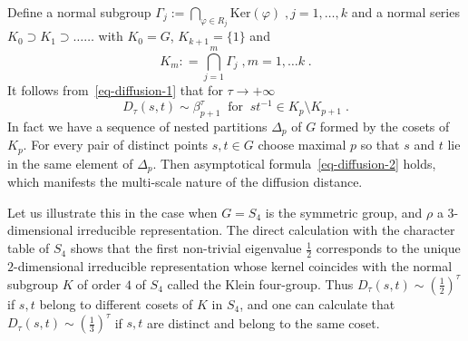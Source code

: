 \documentclass[11pt]{article}
\theoremstyle{definition}
\numberwithin{equation}{section}
\numberwithin{figure}{section}
\numberwithin{table}{section}
\newcommand\< {\mathcal{h}}
\renewcommand\> {\mathcal{i}}
\begin{document}
Define a normal subgroup $\Gamma_j := \bigcap_{\varphi \in R_j} \text{Ker} (\varphi)\;, j= 1,\dots, k$ and a normal series $K_0 \supset K_1 \supset \dots\dots$ with $K_0 = G$, $K_{k+1} =\{1\}$ and
\[
K_m : = \bigcap_{j=1}^m \Gamma_j\;, m=1,\dots k\;.
\]
It follows from~\eqref{eq-diffusion-1} that for $\tau \to +\infty$
\begin{equation}\label{eq-diffusion-2}
D_\tau(s,t) \sim \beta_{p+1}^\tau \;\;\text{for}\;\; st^{-1} \in K_p \setminus K_{p+1}\;.
\end{equation}
In fact we have a sequence of nested partitions $\Delta_p$ of $G$ formed by the cosets of $K_p$. For every pair of distinct points $s,t \in G$ choose maximal $p$ so that $s$ and $t$ lie in the same element of $\Delta_p$. Then asymptotical formula~\eqref{eq-diffusion-2} holds, which manifests the multi-scale nature of the diffusion distance.

Let us illustrate this in the case when $G=S_4$ is the symmetric group, and $\rho$ a $3$-dimensional irreducible representation. The direct calculation with the character table of $S_4$ shows that the first non-trivial eigenvalue $\frac{1}{2}$ corresponds to the unique $2$-dimensional irreducible representation whose kernel coincides with the normal subgroup $K$ of order $4$ of $S_4$ called the Klein four-group. Thus $D_\tau(s,t) \sim (\frac{1}{2})^\tau$ if $s,t$ belong to different cosets of $K$ in $S_4$, and one can calculate that $D_\tau(s,t) \sim (\frac{1}{3})^\tau$ if $s,t$ are distinct and belong to the same coset.
\end{document}

